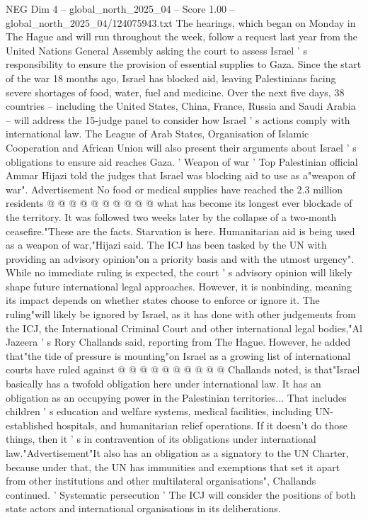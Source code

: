 \begin{textsample}{NEG Dim 4 – global\_north\_2025\_04 – Score 1.00 – global\_north\_2025\_04/124075943.txt}  \label{ex:f4_neg_236}
The hearings, which began on Monday in The Hague and will run throughout the week, follow a request last year from the United Nations General Assembly asking the court to assess Israel ' s responsibility to ensure the provision of essential supplies to Gaza.
Since the start of the war 18 months ago, Israel has blocked aid, leaving Palestinians facing severe shortages of food, water, fuel and medicine.
Over the next five days, 38 countries -- including the United States, China, France, Russia and Saudi Arabia -- will address the 15-judge panel to consider how Israel ' s actions comply with international law.
The League of Arab States, Organisation of Islamic Cooperation and African Union will also present their arguments about Israel ' s obligations to ensure aid reaches Gaza. ' Weapon of war ' Top Palestinian official Ammar Hijazi told the judges that Israel was blocking aid to use as a"weapon of war".
Advertisement No food or medical supplies have reached the 2.3 million residents @ @ @ @ @ @ @ @ @ @ what has become its longest ever blockade of the territory.
It was followed two weeks later by the collapse of a two-month ceasefire."These are the facts.
Starvation is here.
Humanitarian aid is being used as a weapon of war,"Hijazi said.
The ICJ has been tasked by the UN with providing an advisory opinion"on a priority basis and with the utmost urgency".
While no immediate ruling is expected, the court ' s advisory opinion will likely shape future international legal approaches.
However, it is nonbinding, meaning its impact depends on whether states choose to enforce or ignore it.
The ruling"will likely be ignored by Israel, as it has done with other judgements from the ICJ, the International Criminal Court and other international legal bodies,"Al Jazeera ' s Rory Challands said, reporting from The Hague.
However, he added that"the tide of pressure is mounting"on Israel as a growing list of international courts have ruled against @ @ @ @ @ @ @ @ @ @ Challands noted, is that"Israel basically has a twofold obligation here under international law.
It has an obligation as an occupying power in the Palestinian territories...
That includes children ' s education and welfare systems, medical facilities, including UN-established hospitals, and humanitarian relief operations.
If it doesn't do those things, then it ' s in contravention of its obligations under international law."Advertisement"It also has an obligation as a signatory to the UN Charter, because under that, the UN has immunities and exemptions that set it apart from other institutions and other multilateral organisations", Challands continued. ' Systematic persecution ' The ICJ will consider the positions of both state actors and international organisations in its deliberations.

\end{textsample}
